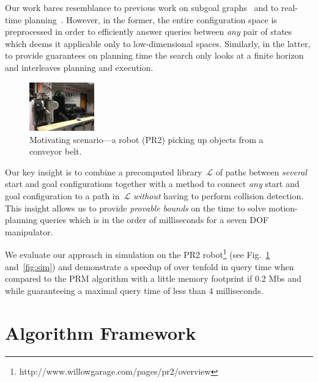 \documentclass[letterpaper, 10 pt, conference]{ieeeconf}  %
\newcommand{\calL}{\ensuremath{\mathcal{L}}\xspace}
\begin{document}
Our work bares resemblance to previous work on 
subgoal graphs~\cite{UK17,UK18} and to real-time planning~\cite{KL06,KS09,K90}.
However, in the former, the entire configuration space is preprocessed in order to efficiently answer queries between \emph{any} pair of states which deems it applicable only to low-dimensional spaces.
Similarly, in the latter, to provide guarantees on planning time the search only looks at a finite horizon and interleaves planning and execution.

\begin{figure}[tb]
  \centering
    \includegraphics[width=0.25\textwidth]{PR2.jpg}
  \caption{
  Motivating scenario---a robot (PR2) picking up objects from a conveyor belt.
}
    \label{fig:PR2}
 \vspace{-6mm}
\end{figure}


Our key insight is to combine a precomputed library~$\calL$ of paths between \emph{several} start and goal configurations together with a method to connect \emph{any} start and goal configuration to a path in~$\calL$ \emph{without} having to perform collision detection.
This insight allows us to provide \emph{provable bounds} on the time to solve motion-planning queries which is in the order of milliseconds for a seven DOF manipulator.

We evaluate our approach in simulation on the PR2 robot\footnote{http://www.willowgarage.com/pages/pr2/overview} (see Fig.~\ref{fig:PR2} and~\ref{fig:sim})
and demonstrate a speedup of over tenfold in query time when compared to the \textsf{PRM} algorithm with a little memory footprint if 0.2 Mbs and while guaranteeing a maximal query time of less than 4 milliseconds.


\section{Algorithm Framework}
\end{document}
